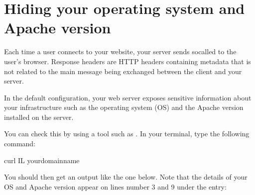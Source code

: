 \documentclass[letterpaper,10pt,english]{sphinxmanual}
\begin{document}
\section{Hiding your operating system and Apache version}
\label{\detokenize{hardening-apache:hiding-your-operating-system-and-apache-version}}
\sphinxAtStartPar
Each time a user connects to your website, your server sends so\sphinxhyphen{}called  to the user’s browser. Response headers are HTTP headers containing metadata that is not related to the main message being exchanged between the client and your server.

\sphinxAtStartPar
In the default configuration, your web server exposes sensitive information about your infrastructure such as the operating system (OS) and the Apache version installed on the server.

\sphinxAtStartPar
You can check this by using a tool such as . In your terminal, type the following command:

\begin{sphinxVerbatim}[commandchars=\\\{\}]
\PYGZdl{} curl \PYGZhy{}IL your\PYGZhy{}domain\PYGZhy{}name
\end{sphinxVerbatim}

\sphinxAtStartPar
You should then get an output like the one below. Note that the details of your OS and Apache version appear on lines number 3 and 9 under the  entry:
\end{document}
